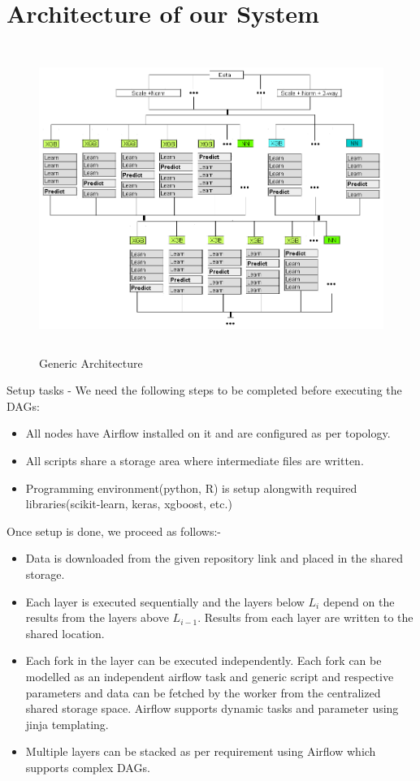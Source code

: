 \documentclass[10pt,onecolumn]{IEEEtran}
\begin{document}
\section{Architecture of our System}
\begin{figure}[!htb]
\centering
\caption{Generic Architecture}
\includegraphics[height=10cm]{images/generic-architecture.png}
\end{figure}

Setup tasks - We need the following steps to be completed before executing the DAGs:
\begin{itemize}
\item All nodes have Airflow installed on it and are configured as per topology.
\item All scripts share a storage area where intermediate files are written.
\item Programming environment(python, R) is setup alongwith required libraries(scikit-learn, keras, xgboost, etc.)
\end{itemize}
Once setup is  done, we proceed as follows:- 
\begin{itemize}
\item Data is downloaded from the given repository link and placed in the shared storage.
\item Each layer is executed sequentially and the layers below $L_i$ depend on the results from the layers above $L_{i-1}$. Results from each layer are written to the shared location.
\item Each fork in the layer can be executed independently. Each fork can be modelled as an independent airflow task and generic script and respective parameters and data can be fetched by the worker from the centralized shared storage space. Airflow supports dynamic tasks and parameter using jinja templating.
\item Multiple layers can be stacked as per requirement using Airflow which supports complex DAGs.

\end{itemize}
\end{document}
